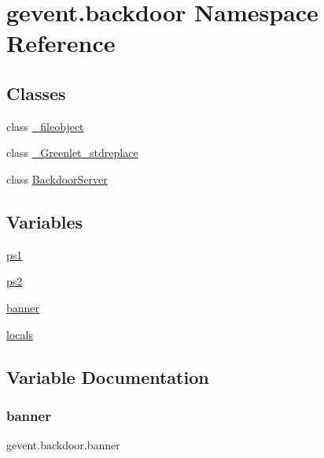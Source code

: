 \hypertarget{namespacegevent_1_1backdoor}{}\section{gevent.\+backdoor Namespace Reference}
\label{namespacegevent_1_1backdoor}
\subsection*{Classes}
\begin{DoxyCompactItemize}
\item 
class \hyperlink{classgevent_1_1backdoor_1_1__fileobject}{\+\_\+fileobject}
\item 
class \hyperlink{classgevent_1_1backdoor_1_1___greenlet__stdreplace}{\+\_\+\+Greenlet\+\_\+stdreplace}
\item 
class \hyperlink{classgevent_1_1backdoor_1_1_backdoor_server}{Backdoor\+Server}
\end{DoxyCompactItemize}
\subsection*{Variables}
\begin{DoxyCompactItemize}
\item 
\hyperlink{namespacegevent_1_1backdoor_a080e64dcf48753bcf49fb05bc5dd4ae0}{ps1}
\item 
\hyperlink{namespacegevent_1_1backdoor_aaee0f383283f7c0b6686ffa26bae5a77}{ps2}
\item 
\hyperlink{namespacegevent_1_1backdoor_aaec91d88642e5a72900cc78e5b061b8b}{banner}
\item 
\hyperlink{namespacegevent_1_1backdoor_ad453c26d42264ab38c7662c601b3776d}{locals}
\end{DoxyCompactItemize}


\subsection{Variable Documentation}
\mbox{\label{namespacegevent_1_1backdoor_aaec91d88642e5a72900cc78e5b061b8b}} 
\subsubsection{\texorpdfstring{banner}{banner}}
{\footnotesize\ttfamily gevent.\+backdoor.\+banner}

